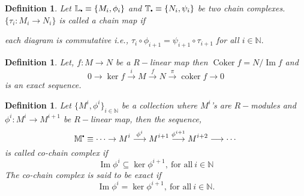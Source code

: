 \documentclass[11pt]{amsart}
\newtheorem{defn}[theorem]{Definition}
\newcommand{\NN}{\mathbb N}
\newcommand\sbullet[1][.5]{\mathbin{\vcenter{\hbox{\scalebox{#1}{$\bullet$}}}}}
\DeclareMathOperator{\im}{\text{Im}}
\begin{document}
\begin{defn}

Let $\mathbb{L}_{\sbullet}\equiv \{M_i,\phi_i\}$ and $\mathbb{T}_{\sbullet}\equiv\{N_i,\psi_i\}$ be two chain complexes. $\{\tau_i:M_i\to N_i\}$ is called a chain map if \begin{center}


\end{center}
each diagram is commutative i.e., $\tau_i\circ \phi_{i+1}=\psi_{i+1}\circ \tau_{i+1}$ for all $i\in{\NN}.$

\end{defn}

\begin{defn}

Let, $f:M\to N$ be a $R-$linear map then $\operatorname{Coker}f=N/\im f$ and $$0\longrightarrow \operatorname{ker}f\stackrel{i}{\longrightarrow}  M\stackrel{f}{\longrightarrow} N\stackrel{\pi}{\longrightarrow}\operatorname{coker}f\longrightarrow 0$$ is an exact sequence.

\end{defn}

\begin{defn}

Let $\{M^i,\phi^i\}_{i\in {\NN}}$ be a collection where $M^i$'s are $R-$modules and $\phi^i:M^i\to M^{i+1}$ be $R-$linear map, then the sequence, $$\mathbb{M}^{\sbullet}\equiv \cdots\to M^i\stackrel{\phi^i}{\longrightarrow} M^{i+1}\stackrel{\phi^{i+1}}{\longrightarrow} M^{i+2}\longrightarrow \cdots $$ is called co-chain complex if $$\operatorname{Im}\phi^i\subseteq \operatorname{ker}\phi^{i+1},~\text{for all}~ i\in {\NN}$$ The co-chain complex is said to be exact if $$\operatorname{Im}\phi^i= \operatorname{ker}\phi^{i+1},~\text{for all}~ i\in {\NN}.$$

\end{defn}
\end{document}
